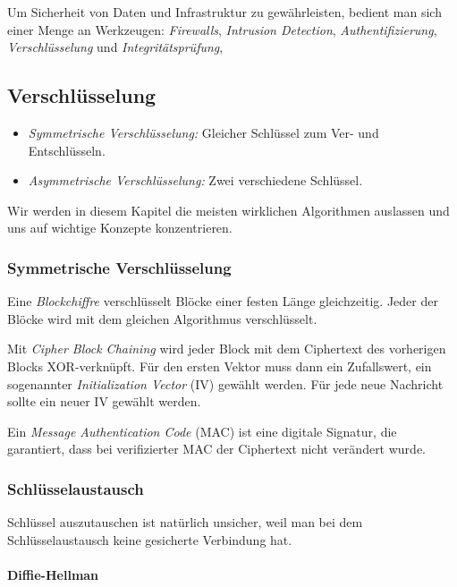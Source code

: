 \documentclass[a4paper,parskip=half*,DIV=15,fontsize=11pt]{scrartcl}
\begin{document}
Um Sicherheit von Daten und Infrastruktur zu gewährleisten, bedient man sich einer Menge an Werkzeugen: \emph{Firewalls}, \emph{Intrusion Detection}, \emph{Authentifizierung}, \emph{Verschlüsselung} und \emph{Integritätsprüfung},

\subsection{Verschlüsselung}

\begin{itemize}
\item \emph{Symmetrische Verschlüsselung:} Gleicher Schlüssel zum Ver- und Entschlüsseln.
\item \emph{Asymmetrische Verschlüsselung:} Zwei verschiedene Schlüssel.
\end{itemize}

Wir werden in diesem Kapitel die meisten wirklichen Algorithmen auslassen und uns auf wichtige Konzepte konzentrieren.

\subsubsection{Symmetrische Verschlüsselung}

Eine \emph{Blockchiffre} verschlüsselt Blöcke einer festen Länge gleichzeitig. Jeder der Blöcke wird mit dem gleichen Algorithmus verschlüsselt.

Mit \emph{Cipher Block Chaining} wird jeder Block mit dem Ciphertext des vorherigen Blocks XOR-verknüpft. Für den ersten Vektor muss dann ein Zufallswert, ein sogenannter \emph{Initialization Vector} (IV) gewählt werden. Für jede neue Nachricht sollte ein neuer IV gewählt werden.

Ein \emph{Message Authentication Code} (MAC) ist eine digitale Signatur, die garantiert, dass bei verifizierter MAC der Ciphertext nicht verändert wurde.

\subsubsection{Schlüsselaustausch}

Schlüssel auszutauschen ist natürlich unsicher, weil man bei dem Schlüsselaustausch keine gesicherte Verbindung hat.

\paragraph{Diffie-Hellman}
\end{document}
